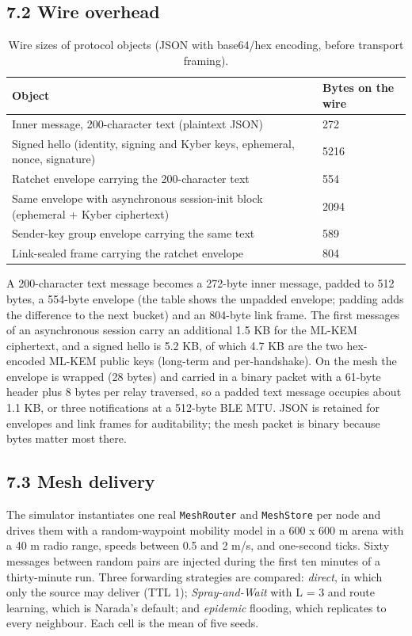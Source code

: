 \documentclass[conference]{IEEEtran}
\begin{document}
\subsection{7.2 Wire overhead}
\begin{table}[t]\centering\footnotesize
\caption{Wire sizes of protocol objects (JSON with base64/hex encoding, before transport framing).}
\begin{tabular}{ll}\toprule
Object & Bytes on the wire \\ \midrule
Inner message, 200-character text (plaintext JSON) & 272 \\
Signed hello (identity, signing and Kyber keys, ephemeral, nonce, signature) & 5216 \\
Ratchet envelope carrying the 200-character text & 554 \\
Same envelope with asynchronous session-init block (ephemeral + Kyber ciphertext) & 2094 \\
Sender-key group envelope carrying the same text & 589 \\
Link-sealed frame carrying the ratchet envelope & 804 \\
\bottomrule\end{tabular}\end{table}
A 200-character text message becomes a 272-byte inner message, padded to 512 bytes, a 554-byte envelope (the table shows the unpadded envelope; padding adds the difference to the next bucket) and an 804-byte link frame. The first messages of an asynchronous session carry an additional 1.5 KB for the ML-KEM ciphertext, and a signed hello is 5.2 KB, of which 4.7 KB are the two hex-encoded ML-KEM public keys (long-term and per-handshake). On the mesh the envelope is wrapped (28 bytes) and carried in a binary packet with a 61-byte header plus 8 bytes per relay traversed, so a padded text message occupies about 1.1 KB, or three notifications at a 512-byte BLE MTU. JSON is retained for envelopes and link frames for auditability; the mesh packet is binary because bytes matter most there.

\subsection{7.3 Mesh delivery}
The simulator instantiates one real \texttt{MeshRouter} and \texttt{MeshStore} per node and drives them with a random-waypoint mobility model in a 600 x 600 m arena with a 40 m radio range, speeds between 0.5 and 2 m/s, and one-second ticks. Sixty messages between random pairs are injected during the first ten minutes of a thirty-minute run. Three forwarding strategies are compared: \emph{direct}, in which only the source may deliver (TTL 1); \emph{Spray-and-Wait} with L = 3 and route learning, which is Narada's default; and \emph{epidemic} flooding, which replicates to every neighbour. Each cell is the mean of five seeds.
\end{document}

